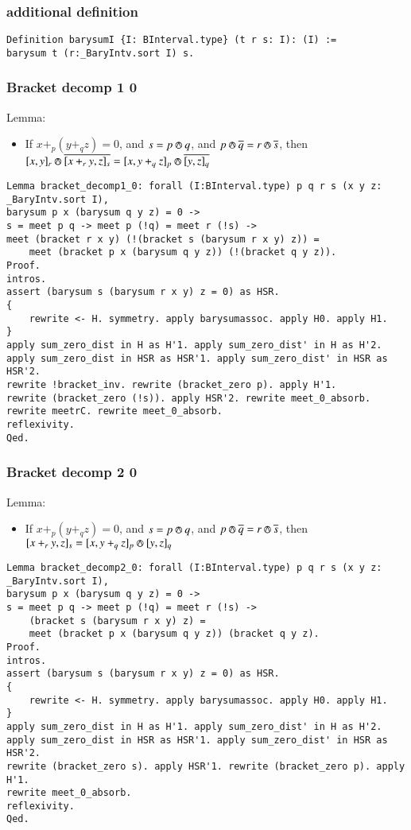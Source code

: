 \documentclass[a4paper,10pt]{article} %
\newcommand{\meet}{\circledwedge}
\begin{document}
\subsubsection{additional definition}
\begin{lstlisting}
Definition barysumI {I: BInterval.type} (t r s: I): (I) :=
barysum t (r:_BaryIntv.sort I) s.
\end{lstlisting}

\subsubsection{Bracket decomp 1 0}
Lemma:
\begin{itemize}
    \item If $x + _p(y + _qz) = 0$, and $s = p \meet q$, and $p \meet \overline{q} = r \meet \overline{s}$, then $[x, y]_r \meet \overline{[x + _ry, z]_s} = [x, y + _qz]_p \meet \overline{[y, z]_q}$
\end{itemize}
\begin{lstlisting}
Lemma bracket_decomp1_0: forall (I:BInterval.type) p q r s (x y z: _BaryIntv.sort I),
barysum p x (barysum q y z) = 0 ->
s = meet p q -> meet p (!q) = meet r (!s) ->  
meet (bracket r x y) (!(bracket s (barysum r x y) z)) = 
    meet (bracket p x (barysum q y z)) (!(bracket q y z)).
Proof.
intros.
assert (barysum s (barysum r x y) z = 0) as HSR.
{
    rewrite <- H. symmetry. apply barysumassoc. apply H0. apply H1.
}
apply sum_zero_dist in H as H'1. apply sum_zero_dist' in H as H'2.
apply sum_zero_dist in HSR as HSR'1. apply sum_zero_dist' in HSR as HSR'2.
rewrite !bracket_inv. rewrite (bracket_zero p). apply H'1.
rewrite (bracket_zero (!s)). apply HSR'2. rewrite meet_0_absorb. rewrite meetrC. rewrite meet_0_absorb.
reflexivity.
Qed.
\end{lstlisting}


\subsubsection{Bracket decomp 2 0}
Lemma:
\begin{itemize}
    \item If $x + _p(y + _qz) = 0$, and $s = p \meet q$, and $p \meet \overline{q} = r \meet \overline{s}$, then $[x + _ry, z]_s = [x, y + _qz]_p \meet [y, z]_q$
\end{itemize}
\begin{lstlisting}
Lemma bracket_decomp2_0: forall (I:BInterval.type) p q r s (x y z: _BaryIntv.sort I),
barysum p x (barysum q y z) = 0 ->
s = meet p q -> meet p (!q) = meet r (!s) ->  
    (bracket s (barysum r x y) z) = 
    meet (bracket p x (barysum q y z)) (bracket q y z).
Proof.
intros.
assert (barysum s (barysum r x y) z = 0) as HSR.
{
    rewrite <- H. symmetry. apply barysumassoc. apply H0. apply H1.
}
apply sum_zero_dist in H as H'1. apply sum_zero_dist' in H as H'2.
apply sum_zero_dist in HSR as HSR'1. apply sum_zero_dist' in HSR as HSR'2.
rewrite (bracket_zero s). apply HSR'1. rewrite (bracket_zero p). apply H'1.
rewrite meet_0_absorb.
reflexivity.
Qed.
\end{lstlisting}
\end{document}
